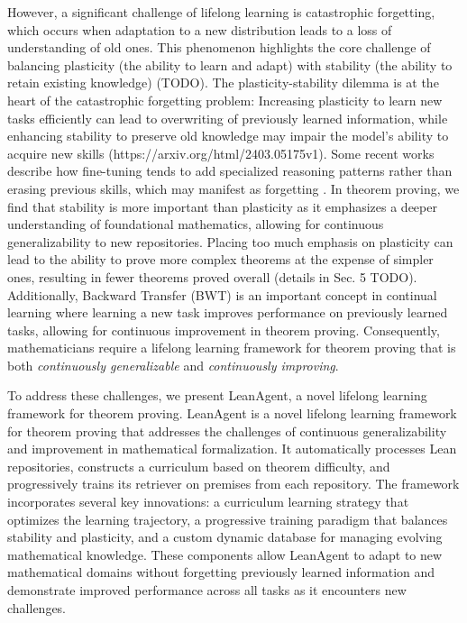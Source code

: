 \documentclass{article} %
\begin{document}
However, a significant challenge of lifelong learning is catastrophic forgetting, which occurs when adaptation to a new distribution leads to a loss of understanding of old ones. This phenomenon highlights the core challenge of balancing plasticity (the ability to learn and adapt) with stability (the ability to retain existing knowledge) (TODO). The plasticity-stability dilemma is at the heart of the catastrophic forgetting problem: Increasing plasticity to learn new tasks efficiently can lead to overwriting of previously learned information, while enhancing stability to preserve old knowledge may impair the model's ability to acquire new skills (https://arxiv.org/html/2403.05175v1). Some recent works describe how fine-tuning tends to add specialized reasoning patterns rather than erasing previous skills, which may manifest as forgetting \citep{jiangInterpretableCatastrophicForgetting2024}. In theorem proving, we find that stability is more important than plasticity as it emphasizes a deeper understanding of foundational mathematics, allowing for continuous generalizability to new repositories. Placing too much emphasis on plasticity can lead to the ability to prove more complex theorems at the expense of simpler ones, resulting in fewer theorems proved overall (details in Sec. 5 TODO). Additionally, Backward Transfer (BWT) is an important concept in continual learning where learning a new task improves performance on previously learned tasks, allowing for continuous improvement in theorem proving. Consequently, mathematicians require a lifelong learning framework for theorem proving that is both \textit{continuously generalizable} and \textit{continuously improving}.

To address these challenges, we present LeanAgent, a novel lifelong learning framework for theorem proving. LeanAgent is a novel lifelong learning framework for theorem proving that addresses the challenges of continuous generalizability and improvement in mathematical formalization. It automatically processes Lean repositories, constructs a curriculum based on theorem difficulty, and progressively trains its retriever on premises from each repository. The framework incorporates several key innovations: a curriculum learning strategy that optimizes the learning trajectory, a progressive training paradigm that balances stability and plasticity, and a custom dynamic database for managing evolving mathematical knowledge. These components allow LeanAgent to adapt to new mathematical domains without forgetting previously learned information and demonstrate improved performance across all tasks as it encounters new challenges.
\end{document}
